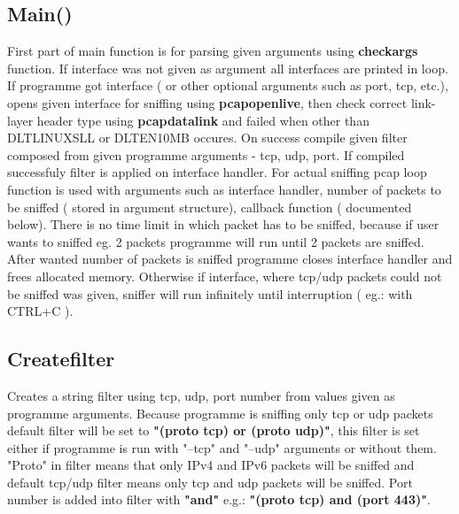 \documentclass{article}
\begin{document}
\subsection{Main()}
First part of main function is for parsing given arguments using \textbf{check\textunderscore args} function. If interface was not given as argument all interfaces are printed in loop.\newline
	If programme got interface ( or other optional arguments such as port, tcp, etc.), 
	opens given interface for sniffing using \textbf{pcap\textunderscore open\textunderscore live}, then check correct link-layer header type using \textbf{pcap\textunderscore datalink} and failed when other than DLT\textunderscore LINUX\textunderscore SLL or DLT\textunderscore EN10MB occures. On success compile given filter composed from given programme arguments - tcp, udp, port. If compiled successfuly filter is applied on interface handler.\newline
	For actual sniffing pcap \textunderscore loop function is used with arguments such as interface handler, number of packets to be sniffed ( stored in argument structure), callback function ( documented below). There is no time limit in which packet has to be sniffed, because if user wants to sniffed eg. 2 packets programme will run until 2 packets are sniffed.  After wanted number of packets is sniffed programme closes interface handler and frees allocated memory.\newline
	 Otherwise if interface, where tcp/udp packets could not be sniffed was given, sniffer will run infinitely until interruption ( eg.: with CTRL+C ).\newline
	
\subsection{Create\textunderscore filter}
Creates a string filter using tcp, udp, port number from values given as programme arguments. Because programme is sniffing only tcp or udp packets default filter will be set to \textbf{"(proto tcp) or (proto udp)"}, this filter is set either if programme is run with "--tcp" and "--udp" arguments or without them. "Proto" in filter means that only IPv4 and IPv6 packets will be sniffed and default tcp/udp filter means only tcp and udp packets will be sniffed. Port number is added into filter with \textbf{"and"} e.g.: \textbf{"(proto tcp) and (port 443)"}.
\end{document}
